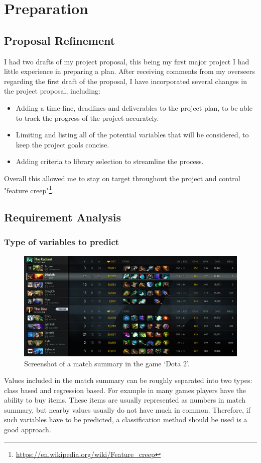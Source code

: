 \documentclass[12pt,a4paper]{book}
\begin{document}
\makeatother
\chapter{Preparation}
\section{Proposal Refinement}
I had two drafts of my project proposal, this being my first major project I had little experience in preparing a plan.
After receiving comments from my overseers regarding the first draft of the proposal, I have incorporated several changes in the project proposal, including:
\begin{itemize}
\item Adding a time-line, deadlines and deliverables to the project plan, to be able to track the progress of the project accurately.
\item Limiting and listing all of the potential variables that will be considered, to keep the project goals concise.
\item Adding criteria to library selection to streamline the process.
\end{itemize}
Overall this allowed me to stay on target throughout the project and control "feature creep"\footnote{\url{https://en.wikipedia.org/wiki/Feature_creep}}.
\section{Requirement Analysis}
\subsection{Type of variables to predict}
\begin{figure}[ht]
\centering
\includegraphics[scale=0.39]{results-summary}
\caption{Screenshot of a match summary in the game `Dota 2'.}
\label{fig:results-summary}
\end{figure}
Values included in the match summary can be roughly separated into two types: class based and regression based.
For example in many games players have the ability to buy items.
These items are usually represented as numbers in match summary, but nearby values usually do not have much in common.
Therefore, if such variables have to be predicted, a classification method should be used is a good approach.
\end{document}
